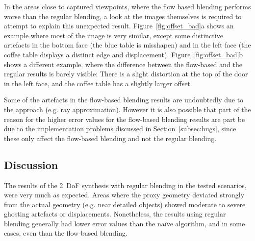 In the areas close to captured viewpoints, where the flow based blending performs worse than the regular blending, a look at the images themselves is required to attempt to explain this unexpected result. Figure~\ref{fig:offset_bad}a shows an example where most of the image is very similar, except some distinctive artefacts in the bottom face (the blue table is misshapen) and in the left face (the coffee table displays a distinct edge and displacement). Figure~\ref{fig:offset_bad}b shows a different example, where the difference between the flow-based and the regular results is barely visible: There is a slight distortion at the top of the door in the left face, and the coffee table has a slightly larger offset.

Some of the artefacts in the flow-based blending results are undoubtedly due to the approach (e.g. ray approximation). However it is also possible that part of the reason for the higher error values for the flow-based blending results are part be due to the implementation problems discussed in Section~\ref{subsec:bugs}, since these only affect the flow-based blending and not the regular blending.









\subsection{Discussion} \label{subsec:discussion_virtual}
The results of the 2~DoF synthesis with regular blending in the tested scenarios, were very much as expected. Areas where the proxy geometry deviated strongly from the actual geometry (e.g. near detailed objects) showed moderate to severe ghosting artefacts or displacements. Nonetheless, the results using regular blending generally had lower error values than the na\"ive algorithm, and in some cases, even than the flow-based blending.

